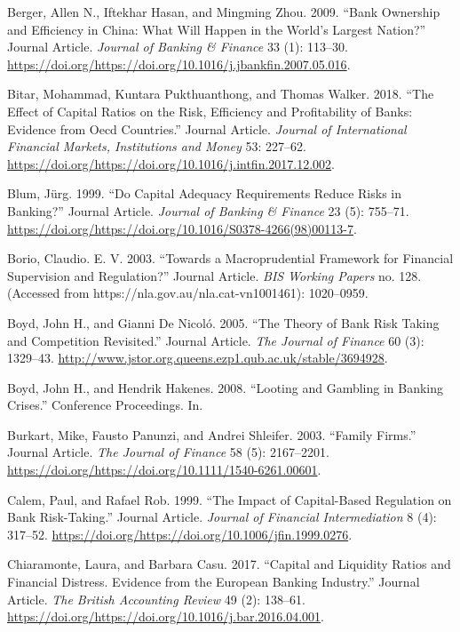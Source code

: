 \documentclass{article}
\begin{document}
\leavevmode\hypertarget{ref-RN26}{}%
Berger, Allen N., Iftekhar Hasan, and Mingming Zhou. 2009. ``Bank
Ownership and Efficiency in China: What Will Happen in the World's
Largest Nation?'' Journal Article. \emph{Journal of Banking \& Finance}
33 (1): 113--30.
\url{https://doi.org/https://doi.org/10.1016/j.jbankfin.2007.05.016}.

\leavevmode\hypertarget{ref-RN28}{}%
Bitar, Mohammad, Kuntara Pukthuanthong, and Thomas Walker. 2018. ``The
Effect of Capital Ratios on the Risk, Efficiency and Profitability of
Banks: Evidence from Oecd Countries.'' Journal Article. \emph{Journal of
International Financial Markets, Institutions and Money} 53: 227--62.
\url{https://doi.org/https://doi.org/10.1016/j.intfin.2017.12.002}.

\leavevmode\hypertarget{ref-RN29}{}%
Blum, Jürg. 1999. ``Do Capital Adequacy Requirements Reduce Risks in
Banking?'' Journal Article. \emph{Journal of Banking \& Finance} 23 (5):
755--71.
\url{https://doi.org/https://doi.org/10.1016/S0378-4266(98)00113-7}.

\leavevmode\hypertarget{ref-RN30}{}%
Borio, Claudio. E. V. 2003. ``Towards a Macroprudential Framework for
Financial Supervision and Regulation?'' Journal Article. \emph{BIS
Working Papers} no. 128. (Accessed from
https://nla.gov.au/nla.cat-vn1001461): 1020--0959.

\leavevmode\hypertarget{ref-RN32}{}%
Boyd, John H., and Gianni De Nicoló. 2005. ``The Theory of Bank Risk
Taking and Competition Revisited.'' Journal Article. \emph{The Journal
of Finance} 60 (3): 1329--43.
\url{http://www.jstor.org.queens.ezp1.qub.ac.uk/stable/3694928}.

\leavevmode\hypertarget{ref-RN31}{}%
Boyd, John H., and Hendrik Hakenes. 2008. ``Looting and Gambling in
Banking Crises.'' Conference Proceedings. In.

\leavevmode\hypertarget{ref-RN33}{}%
Burkart, Mike, Fausto Panunzi, and Andrei Shleifer. 2003. ``Family
Firms.'' Journal Article. \emph{The Journal of Finance} 58 (5):
2167--2201.
\url{https://doi.org/https://doi.org/10.1111/1540-6261.00601}.

\leavevmode\hypertarget{ref-RN35}{}%
Calem, Paul, and Rafael Rob. 1999. ``The Impact of Capital-Based
Regulation on Bank Risk-Taking.'' Journal Article. \emph{Journal of
Financial Intermediation} 8 (4): 317--52.
\url{https://doi.org/https://doi.org/10.1006/jfin.1999.0276}.

\leavevmode\hypertarget{ref-RN36}{}%
Chiaramonte, Laura, and Barbara Casu. 2017. ``Capital and Liquidity
Ratios and Financial Distress. Evidence from the European Banking
Industry.'' Journal Article. \emph{The British Accounting Review} 49
(2): 138--61.
\url{https://doi.org/https://doi.org/10.1016/j.bar.2016.04.001}.
\end{document}
